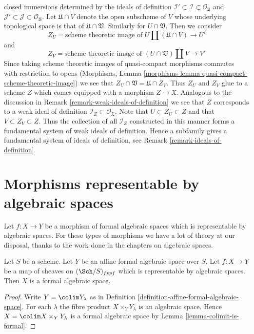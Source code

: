 \begin{remark}
closed immersions determined by the ideals of definition
$\mathcal{I}' \subset \mathcal{I} \subset \mathcal{O}_\mathfrak U$
and
$\mathcal{J}' \subset \mathcal{J} \subset \mathcal{O}_\mathfrak U$.
Let $\mathfrak U \cap V$ denote the open subscheme of $V$ whose
underlying topological space is that of $\mathfrak U \cap \mathfrak V$.
Similarly for $U \cap \mathfrak V$. Then we consider
$$
Z_U = \text{scheme theoretic image of }
U \amalg (\mathfrak U \cap V) \longrightarrow U'
$$
and
$$
Z_V = \text{scheme theoretic image of }
(U \cap \mathfrak V) \amalg V \longrightarrow V'
$$
Since taking scheme theoretic images of quasi-compact morphisms
commutes with restriction to opens (Morphisms, Lemma
\ref{morphisms-lemma-quasi-compact-scheme-theoretic-image})
we see that $Z_U \cap \mathfrak V = \mathfrak U \cap Z_V$.
Thus $Z_U$ and $Z_V$ glue to a scheme $Z$ which comes equipped
with a morphism $Z \to \mathfrak X$. Analogous to the discussion in
Remark \ref{remark-weak-ideals-of-definition}
we see that $Z$ corresponds to a weak ideal
of definition $\mathcal{I}_Z \subset \mathcal{O}_\mathfrak X$.
Note that $U \subset Z_U \subset Z$ and that
$V \subset Z_V \subset Z$. Thus the collection of all $\mathcal{I}_Z$
constructed in this manner forms a fundamental system of weak
ideals of definition. Hence a subfamily gives a fundamental system of ideals
of definition, see Remark \ref{remark-ideals-of-definition}.
\end{remark}






\section{Morphisms representable by algebraic spaces}
\label{section-representable}

\noindent
Let $f : X \to Y$ be a morphism of formal algebraic spaces which
is representable by algebraic spaces. For these types of morphisms
we have a lot of theory at our disposal, thanks to the work done
in the chapters on algebraic spaces.

\begin{lemma}
\label{lemma-algebraic-space-over-affine-formal}
Let $S$ be a scheme. Let $Y$ be an affine formal algebraic space over $S$.
Let $f : X \to Y$ be a map of sheaves on $(\Sch/S)_{fppf}$ which is
representable by algebraic spaces. Then $X$ is a formal
algebraic space.
\end{lemma}

\begin{proof}
Write $Y = \colim Y_\lambda$ as in
Definition \ref{definition-affine-formal-algebraic-space}.
For each $\lambda$ the fibre product
$X \times_Y Y_\lambda$ is an algebraic space.
Hence $X = \colim X \times_Y Y_\lambda$ is a formal
algebraic space by Lemma \ref{lemma-colimit-is-formal}.
\end{proof}

